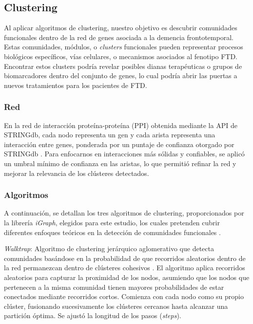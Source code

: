 \subsection{Clustering}

Al aplicar algoritmos de clustering, nuestro objetivo es descubrir comunidades funcionales dentro de la red de genes asociada a la demencia frontotemporal. Estas comunidades, módulos, o \textit{clusters} funcionales pueden representar procesos biológicos específicos, vías celulares, o mecanismos asociados al fenotipo FTD. Encontrar estos clusters podría revelar posibles dianas terapéuticas o grupos de biomarcadores dentro del conjunto de genes, lo cual podría abrir las puertas a nuevos tratamientos para los pacientes de FTD.

\subsubsection{Red}

En la red de interacción proteína-proteína (PPI) obtenida mediante la API de STRINGdb, cada nodo representa un gen y cada arista representa una interacción entre genes, ponderada por un puntaje de confianza otorgado por STRINGdb \cite{szklarczyk2023stringdb}. Para enfocarnos en interacciones más sólidas y confiables, se aplicó un umbral mínimo de confianza en las aristas, lo que permitió refinar la red y mejorar la relevancia de los clústeres detectados. 


\subsubsection{Algoritmos}
\label{sec:algoritmos}

A continuación, se detallan los tres algoritmos de clustering, proporcionados por la librería \textit{iGraph}, elegidos para este estudio, los cuales pretenden cubrir diferentes enfoques teóricos en la detección de comunidades funcionales \cite{igraph}.  

\textit{Walktrap}: Algoritmo de clustering jerárquico aglomerativo que detecta comunidades basándose en la probabilidad de que recorridos aleatorios dentro de la red permanezcan dentro de clústeres cohesivos \cite{pons2005walktrap}. El algoritmo aplica recorridos aleatorios para capturar la proximidad de los nodos, asumiendo que los nodos que pertenecen a la misma comunidad tienen mayores probabilidades de estar conectados mediante recorridos cortos. Comienza con cada nodo como su propio clúster, fusionando sucesivamente los clústeres cercanos hasta alcanzar una partición óptima. Se ajustó la longitud de los pasos (\textit{steps}).

